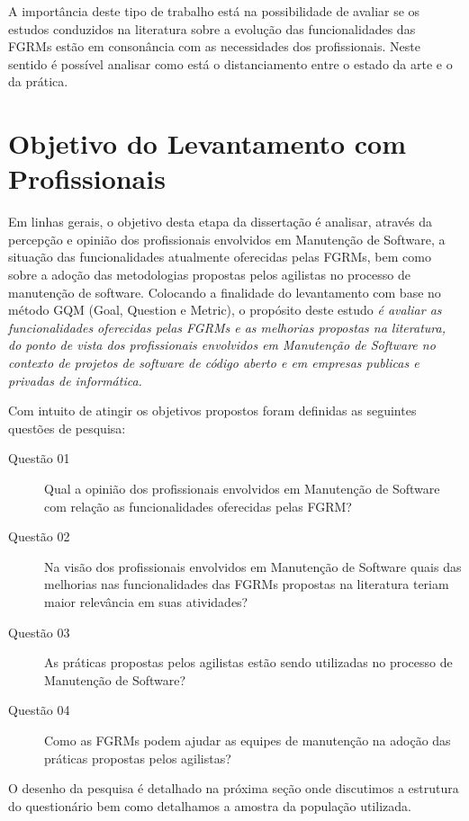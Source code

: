 A importância deste tipo de trabalho está na possibilidade de avaliar se os
estudos conduzidos na literatura sobre a evolução das funcionalidades das FGRMs
estão em consonância com as necessidades dos profissionais. Neste sentido é
possível analisar como está o distanciamento entre o estado da arte e o da
prática.

\section{Objetivo do Levantamento com Profissionais}\label{sec:objetivo_da_pesquisa_com_profissionais}

Em linhas gerais, o objetivo desta etapa da dissertação é analisar, através da
percepção e opinião dos profissionais envolvidos em Manutenção de Software, a
situação das funcionalidades atualmente oferecidas pelas FGRMs, bem como sobre a
adoção das metodologias propostas pelos agilistas no processo de manutenção de
software. Colocando a finalidade do levantamento com base no método GQM
(Goal, Question e Metric)\cite{gqm}, o propósito deste estudo \textit{é avaliar
    as funcionalidades oferecidas pelas FGRMs e as melhorias propostas na
    literatura, do ponto de vista dos profissionais envolvidos em Manutenção de
    Software no contexto de projetos de software de código aberto e em empresas
    publicas e privadas de informática.}

Com intuito de atingir os objetivos propostos foram definidas as seguintes
questões de pesquisa:

\begin{description}
	\item[Questão 01] Qual a opinião dos profissionais envolvidos em Manutenção
		de Software com relação as funcionalidades oferecidas pelas
		FGRM\@?
	\item[Questão 02] Na visão dos profissionais envolvidos em Manutenção de
        Software quais das melhorias nas funcionalidades das FGRMs propostas na
        literatura teriam maior relevância em suas atividades?
	\item[Questão 03] As práticas propostas pelos agilistas estão sendo
        utilizadas no processo de Manutenção de Software?
    \item[Questão 04] Como as FGRMs podem ajudar as equipes de manutenção na
        adoção das práticas propostas pelos agilistas?
\end{description}

O desenho da pesquisa é detalhado na próxima seção onde discutimos a estrutura
do questionário bem como detalhamos a amostra da população utilizada.

